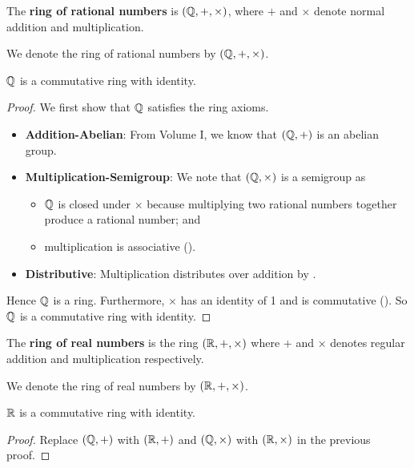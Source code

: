 \begin{definition}
    The \textbf{ring of rational numbers} is $(\mathbb{Q}, +, \times)$, where $+$ and $\times$ denote normal addition and multiplication.
\end{definition}
\begin{remark}
    We denote the ring of rational numbers by $(\mathbb{Q}, +, \times)$.
\end{remark}
\begin{proposition}
    $\mathbb{Q}$ is a commutative ring with identity.
\end{proposition}
\begin{proof}
    We first show that $\mathbb{Q}$ satisfies the ring axioms.
    \begin{itemize}
        \item \textbf{Addition-Abelian}: From Volume I, we know that $(\mathbb{Q}, +)$ is an abelian group.
        \item \textbf{Multiplication-Semigroup}: We note that $(\mathbb{Q}, \times)$ is a semigroup as
        \begin{itemize}
            \item $\mathbb{Q}$ is closed under $\times$ because multiplying two rational numbers together produce a rational number; and
            \item multiplication is associative ().
        \end{itemize}
        \item \textbf{Distributive}: Multiplication distributes over addition by .
    \end{itemize}
    Hence $\mathbb{Q}$ is a ring. Furthermore, $\times$ has an identity of 1 and is commutative (). So $\mathbb{Q}$ is a commutative ring with identity.
\end{proof}

\begin{definition}
    The \textbf{ring of real numbers} is the ring $(\mathbb{R}, +, \times)$ where $+$ and $\times$ denotes regular addition and multiplication respectively.
\end{definition}
\begin{remark}
    We denote the ring of real numbers by $(\mathbb{R}, +, \times)$.
\end{remark}
\begin{proposition}
    $\mathbb{R}$ is a commutative ring with identity.
\end{proposition}
\begin{proof}
    Replace $(\mathbb{Q}, +)$ with $(\mathbb{R}, +)$ and $(\mathbb{Q}, \times)$ with $(\mathbb{R}, \times)$ in the previous proof.
\end{proof}

